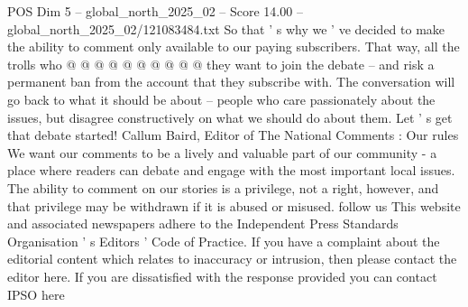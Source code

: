 \begin{textsample}{POS Dim 5 – global\_north\_2025\_02 – Score 14.00 – global\_north\_2025\_02/121083484.txt}
So that ' s why we ' ve decided to make the ability to comment only available to our paying subscribers.
That way, all the trolls who @ @ @ @ @ @ @ @ @ @ they want to join the debate -- and risk a permanent ban from the account that they subscribe with.
The conversation will go back to what it should be about -- people who care passionately about the issues, but disagree constructively on what we should do about them.
Let ' s get that debate started!
Callum Baird, Editor of The National Comments : Our rules We want our comments to be a lively and valuable part of our community - a place where readers can debate and engage with the most important local issues.
The ability to comment on our stories is a privilege, not a right, however, and that privilege may be withdrawn if it is abused or misused. follow us This website and associated newspapers adhere to the Independent Press Standards Organisation ' s Editors ' Code of Practice.
If you have a complaint about the editorial content which relates to inaccuracy or intrusion, then please contact the editor here.
If you are dissatisfied with the response provided you can contact IPSO here

\end{textsample}
